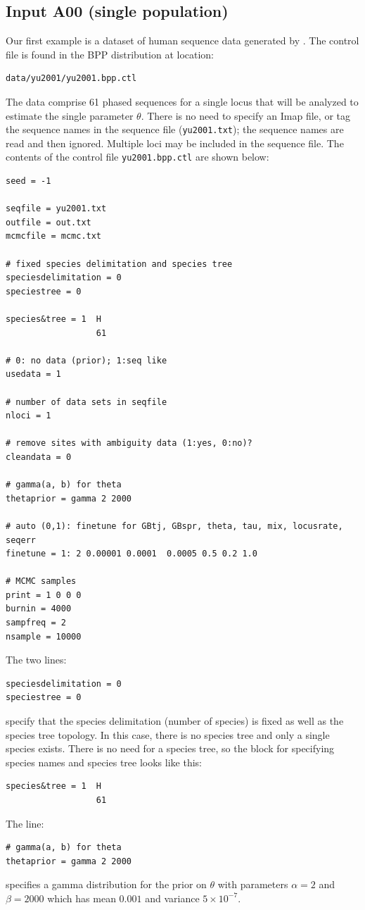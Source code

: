 \documentclass[a4paper]{book}
\numberwithin{equation}{section} \renewcommand{\baselinestretch}{0.55}
\begin{document}
\subsection{Input A00 (single population)}
Our first example is a dataset of human sequence data generated by
\citet{Yu2001}. The control file is found in the BPP distribution at
location:
\begin{verbatim}
data/yu2001/yu2001.bpp.ctl
\end{verbatim}
The data comprise 61 phased sequences for a single locus that will be
analyzed to estimate the single parameter $\theta$.  There is no need
to specify an Imap file, or tag the sequence names in the sequence
file (\texttt{yu2001.txt}); the sequence names are read and then
ignored.  Multiple loci may be included in the sequence file. The
contents of the control file \texttt{yu2001.bpp.ctl} are shown below:

{\small
\begin{verbatim}
seed = -1

seqfile = yu2001.txt
outfile = out.txt
mcmcfile = mcmc.txt

# fixed species delimitation and species tree
speciesdelimitation = 0 
speciestree = 0

species&tree = 1  H
                  61  

# 0: no data (prior); 1:seq like
usedata = 1

# number of data sets in seqfile
nloci = 1    

# remove sites with ambiguity data (1:yes, 0:no)?
cleandata = 0    

# gamma(a, b) for theta
thetaprior = gamma 2 2000

# auto (0,1): finetune for GBtj, GBspr, theta, tau, mix, locusrate, seqerr
finetune = 1: 2 0.00001 0.0001  0.0005 0.5 0.2 1.0  

# MCMC samples
print = 1 0 0 0  
burnin = 4000
sampfreq = 2
nsample = 10000
\end{verbatim}
}
\noindent
The two lines:
\begin{verbatim}
speciesdelimitation = 0 
speciestree = 0
\end{verbatim}
specify that the species delimitation (number of species) is fixed as
well as the species tree topology. In this case,
there is no species tree and only a single species exists.  There is
no need for a species tree, so the block for specifying species names
and species tree looks like this:
\begin{verbatim}
species&tree = 1  H
                  61
\end{verbatim}
\noindent
The line:
\begin{verbatim}
# gamma(a, b) for theta
thetaprior = gamma 2 2000
\end{verbatim}
specifies a gamma distribution for the prior on $\theta$ with
parameters $\alpha = 2$ and $\beta = 2000$ which has mean $0.001$ and
variance $5 \times 10^{-7}$.
\end{document}
